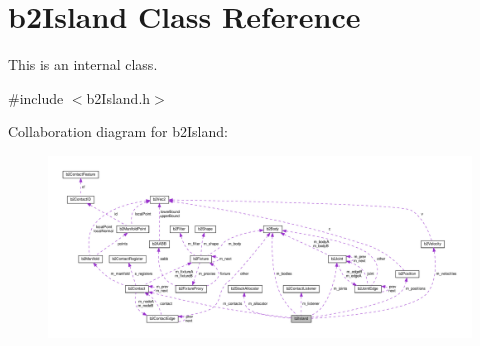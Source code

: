 \hypertarget{classb2Island}{}\section{b2\+Island Class Reference}
\label{classb2Island}


This is an internal class.  




{\ttfamily \#include $<$b2\+Island.\+h$>$}



Collaboration diagram for b2\+Island\+:
\nopagebreak
\begin{figure}[H]
\begin{center}
\leavevmode
\includegraphics[width=350pt]{classb2Island__coll__graph}
\end{center}
\end{figure}
